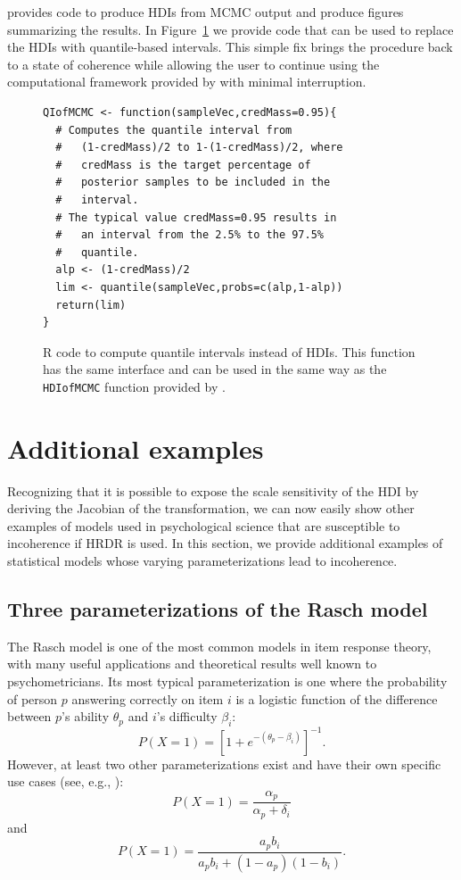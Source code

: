 \documentclass[9pt,twocolumn,twoside]{cidlab-draft}\templatetype{cidlab-invited}
\newcommand{\hdr}{HRDR}
\begin{document}
 provides code to produce HDIs from MCMC output and produce figures summarizing the results. In Figure~\ref{fig:rcode} we provide code that can be used to replace the HDIs with quantile-based intervals. This simple fix brings the procedure back to a state of coherence while allowing the user to continue using the computational framework provided by  with minimal interruption.

\begin{figure}[h]
    \centering
\begin{lstlisting}[style=rstyle,label=lst:r-code]
QIofMCMC <- function(sampleVec,credMass=0.95){
  # Computes the quantile interval from
  #   (1-credMass)/2 to 1-(1-credMass)/2, where
  #   credMass is the target percentage of 
  #   posterior samples to be included in the
  #   interval.
  # The typical value credMass=0.95 results in
  #   an interval from the 2.5% to the 97.5%
  #   quantile.
  alp <- (1-credMass)/2
  lim <- quantile(sampleVec,probs=c(alp,1-alp))
  return(lim)
}\end{lstlisting}
\caption{R code to compute quantile intervals instead of HDIs.  This function has the same interface and can be used in the same way as the \texttt{HDIofMCMC} function provided by \protect{}.}
    \label{fig:rcode}
\end{figure}

\section*{Additional examples}

Recognizing that it is possible to expose the scale sensitivity of the HDI by deriving the Jacobian of the transformation, we can now easily show other examples of models used in psychological science that are susceptible to incoherence if \hdr{} is used.  In this section, we provide  additional examples of statistical models whose varying parameterizations lead to incoherence.

\subsection*{Three parameterizations of the Rasch model}

The Rasch model \cite{Rasch1960} is one of the most common models in item response theory, with many useful applications and theoretical results well known to psychometricians.  Its most typical parameterization is one where the probability of person $p$ answering correctly on item $i$ is a logistic function of the difference between $p$'s ability $\theta_p$ and $i$'s difficulty $\beta_i$: $$P(X = 1) = \left[1+e^{-(\theta_p-\beta_i)}\right]^{-1}.$$ However, at least two other parameterizations exist and have their own specific use cases (see, e.g., ): $$P(X = 1) = \frac{\alpha_p}{\alpha_p + \delta_i}$$ and $$P(X = 1) = \frac{a_p b_i}{a_pb_i+(1-a_p)(1-b_i)}.$$
\end{document}
